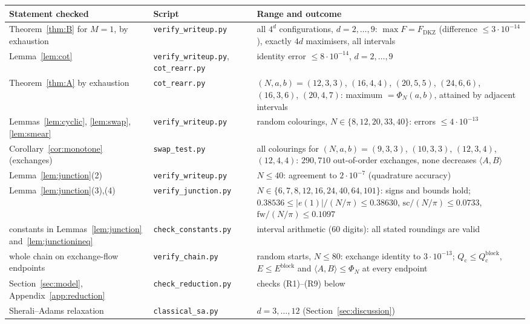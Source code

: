\documentclass[11pt]{amsart}
\theoremstyle{definition}
\theoremstyle{remark}
\newcommand{\ip}[2]{\langle #1,#2\rangle}
\newcommand{\FD}{F_{\mathrm{DKZ}}}
\newcommand{\Qc}{Q_{\mathrm{c}}}
\newcommand{\sprod}{\mathrm{sc}}
\newcommand{\fw}{\mathrm{fw}}
\begin{document}
\begin{table}[h]
\small
\begin{tabular}{@{}>{\raggedright\arraybackslash}p{}>{\raggedright\arraybackslash}p{}>{\raggedright\arraybackslash}p{}@{}}
\toprule
Statement checked & Script & Range and outcome\\
\midrule
Theorem~\ref{thm:B} for $M=1$, by exhaustion & \texttt{verify\_writeup.py} & all $4^d$ configurations, $d=2,\dots,9$:
$\max F=\FD$ (difference $\le 3\cdot10^{-14}$), exactly $4d$ maximisers, all intervals\\
Lemma~\ref{lem:cot} & \texttt{verify\_writeup.py}, \texttt{cot\_rearr.py} & identity error $\le 8\cdot10^{-14}$, $d=2,\dots,9$\\
Theorem~\ref{thm:A} by exhaustion & \texttt{cot\_rearr.py} & $(N,a,b)=(12,3,3)$, $(16,4,4)$, $(20,5,5)$, $(24,6,6)$,
$(16,3,6)$, $(20,4,7)$: maximum $=\Phi_N(a,b)$, attained by adjacent intervals\\
Lemmas~\ref{lem:cyclic}, \ref{lem:swap}, \ref{lem:smear} & \texttt{verify\_writeup.py} & random colourings,
$N\in\{8,12,20,33,40\}$: errors $\le4\cdot10^{-13}$\\
Corollary~\ref{cor:monotone} (exchanges) & \texttt{swap\_test.py} & all colourings for $(N,a,b)=(9,3,3)$, $(10,3,3)$,
$(12,3,4)$, $(12,4,4)$: $290{,}710$ out-of-order exchanges, none decreases $\ip AB$\\
Lemma~\ref{lem:junction}(2) & \texttt{verify\_writeup.py} & $N\le40$: agreement to $2\cdot10^{-7}$ (quadrature accuracy)\\
Lemma~\ref{lem:junction}(3),(4) & \texttt{verify\_junction.py} & $N\in\{6,7,8,12,16,24,40,64,101\}$: signs and bounds hold;
$0.38536\le|e(1)|/(N/\pi)\le0.38630$, $\sprod/(N/\pi)\le0.0733$, $\fw/(N/\pi)\le0.1097$\\
constants in Lemmas~\ref{lem:junction} and~\ref{lem:junctionineq} & \texttt{check\_constants.py} & interval arithmetic
(60 digits): all stated roundings are valid\\
whole chain on exchange-flow endpoints & \texttt{verify\_chain.py} & random starts, $N\le80$: exchange identity to
$3\cdot10^{-13}$; $\Qc\le\Qc^{\mathrm{block}}$, $E\le E^{\mathrm{block}}$ and $\ip AB\le\Phi_N$ at every endpoint\\
Section~\ref{sec:model}, Appendix~\ref{app:reduction} & \texttt{check\_reduction.py} & checks (R1)--(R9) below\\
Sherali--Adams relaxation & \texttt{classical\_sa.py} & $d=3,\dots,12$ (Section~\ref{sec:discussion})\\
\bottomrule
\end{tabular}
\end{table}
\end{document}
